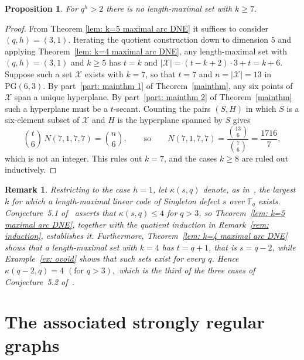 \documentclass[12pt, twoside]{article}
\newtheorem{prop}[theorem]{\bf Proposition}
\newtheorem{remark}[theorem]{\bf Remark}
\begin{document}
	
	\begin{prop}\label{prop: q3 k7}
		For $q^h>2$ there is no length-maximal set with $k\ge 7$.
	\end{prop}

	\begin{proof} From Theorem \ref{lem: k=5 maximal arc DNE} it suffices to consider $(q,h)=(3,1)$. 
		Iterating the quotient construction down to dimension $5$ and applying Theorem~\ref{lem: k=4 maximal arc DNE}, any length-maximal set with $(q,h)=(3,1)$ and $k\ge5$ has $t=k$ and $|\mathcal{X}|=(t-k+2)\cdot3+t=k+6$. Suppose such a set $\mathcal{X}$ exists with $k=7$, so that $t=7$ and $n=|\mathcal{X}|=13$ in $\mathrm{PG}(6,3)$. By part~\ref{part: mainthm 1} of Theorem~\ref{mainthm}, any six points of $\mathcal{X}$ span a unique hyperplane. By part~\ref{part: mainthm 2} of Theorem~\ref{mainthm} such a hyperplane must be a $t$-secant. Counting the pairs $(S,H)$ in which $S$ is a six-element subset of $\mathcal{X}$ and $H$ is the hyperplane spanned by $S$ gives
		$$
		\binom{t}{6}\,N(7,1,7,7) = \binom{n}{6}, \qquad\text{so}\qquad N(7,1,7,7)=\frac{\binom{13}{6}}{\binom{7}{6}}=\frac{1716}{7},
		$$
		which is not an integer. This rules out $k=7$, and the cases $k\ge8$ are ruled out inductively.
	\end{proof}
	

	
	
	
		\begin{remark}\label{rem: AZ conjectures}
		Restricting to the case $h=1$, let $\kappa(s,q)$ denote, as in~\cite{AZ}, the largest $k$ for which a length-maximal linear code of Singleton defect $s$ over $\mathbb{F}_q$ exists.
		Conjecture~5.1 of~\cite{AZ} asserts that $\kappa(s,q)\le4$ for $q>3$, so Theorem~\ref{lem: k=5 maximal arc DNE}, together with the quotient induction in Remark~\ref{rem: induction}, establishes it. Furthermore, Theorem~\ref{lem: k=4 maximal arc DNE} shows that a length-maximal set with $k=4$ has $t=q+1$, that is $s=q-2$, while Example~\ref{ex: ovoid} shows that such sets exist for every $q$. Hence
		$
		\kappa(q-2,q)=4 $ $ (\text{for }q>3),
		$
		which is the third of the three cases of Conjecture~5.2 of~\cite{AZ}.
	\end{remark}
	
	\section{The associated strongly regular graphs}\label{sec: srg}
\end{document}
